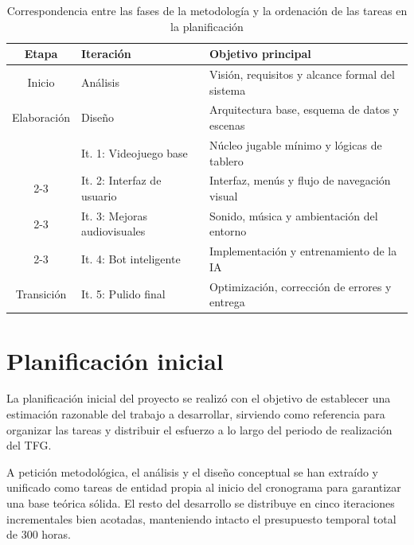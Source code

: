 \begin{table}[H]
	\centering
	\begin{tabular}{|c|p{}|p{}|}
		\hline
		\textbf{Etapa} & \textbf{Iteración} & \textbf{Objetivo principal} \\
		\hline
		Inicio & Análisis & Visión, requisitos y alcance formal del sistema \\
		\hline
		Elaboración & Diseño & Arquitectura base, esquema de datos y escenas \\
		\hline
		& It. 1: Videojuego base & Núcleo jugable mínimo y lógicas de tablero \\ \cline{2-3}
		& It. 2: Interfaz de usuario & Interfaz, menús y flujo de navegación visual \\ \cline{2-3}
		& It. 3: Mejoras audiovisuales & Sonido, música y ambientación del entorno \\ \cline{2-3}
		\multirow{-4}{*}{Construcción} & It. 4: Bot inteligente & Implementación y entrenamiento de la IA \\
		\hline
		Transición & It. 5: Pulido final & Optimización, corrección de errores y entrega \\
		\hline
	\end{tabular}
	\caption{Correspondencia entre las fases de la metodología y la ordenación de las tareas en la planificación}
	\label{tab:fases_up}
\end{table}

\section{Planificación inicial}

La planificación inicial del proyecto se realizó con el objetivo de establecer una estimación razonable del trabajo a desarrollar, sirviendo como referencia para organizar las tareas y distribuir el esfuerzo a lo largo del periodo de realización del TFG. 

A petición metodológica, el análisis y el diseño conceptual se han extraído y unificado como tareas de entidad propia al inicio del cronograma para garantizar una base teórica sólida. El resto del desarrollo se distribuye en cinco iteraciones incrementales bien acotadas, manteniendo intacto el presupuesto temporal total de 300 horas.

